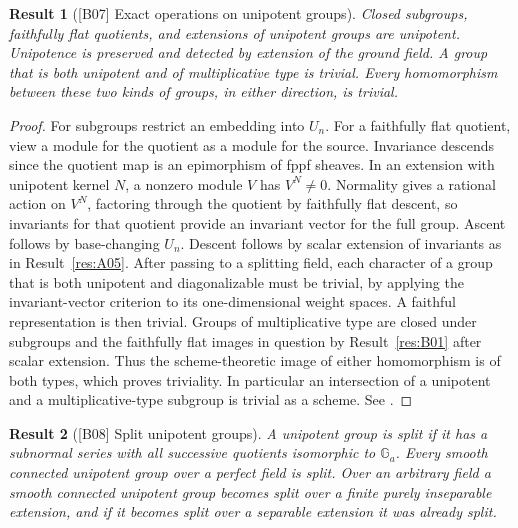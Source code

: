 \documentclass[11pt,a4paper,openany,oneside]{book}
\theoremstyle{resultstyle}
\newtheorem{statement}{Result}[chapter]
\newenvironment{result}[2]{\clubpenalty=10000\begin{statement}[\textnormal{[#1]} #2]\leavevmode\label{res:#1}\ignorespaces}{\end{statement}}
\theoremstyle{definition}
\numberwithin{equation}{chapter}
\begin{document}
\begin{result}{B07}{Exact operations on unipotent groups}
Closed subgroups, faithfully flat quotients, and extensions of
unipotent groups are unipotent. Unipotence is preserved and detected
by extension of the ground field. A group that is both unipotent
and of multiplicative type is trivial. Every homomorphism between
these two kinds of groups, in either direction, is trivial.
\end{result}

\begin{proof}
For subgroups restrict an embedding into \(U_n\).
For a faithfully flat quotient, view a module for the quotient as
a module for the source. Invariance descends since the quotient
map is an epimorphism of fppf sheaves. In an extension with
unipotent kernel \(N\), a nonzero module \(V\) has \(V^N\ne0\).
Normality gives a rational action on \(V^N\), factoring through the
quotient by faithfully flat descent, so invariants for that quotient
provide an invariant vector for the full group. Ascent follows by
base-changing \(U_n\). Descent follows by scalar extension of
invariants as in Result~\ref{res:A05}. After passing to a splitting
field, each character of a group that is both unipotent and
diagonalizable must be trivial, by applying the invariant-vector
criterion to its one-dimensional weight spaces. A faithful
representation is then trivial. Groups of multiplicative type are
closed under subgroups and the faithfully flat images in question
by Result~\ref{res:B01} after scalar extension. Thus the
scheme-theoretic image of either homomorphism is of both types,
which proves triviality. In particular an intersection of a
unipotent and a multiplicative-type subgroup is trivial as a
scheme. See \cite[Corollaries 14.7, 14.9--14.10 and
Proposition 14.16, Corollaries 14.17--14.18]{milne}.
\end{proof}

\begin{result}{B08}{Split unipotent groups}
A unipotent group is split if it has a subnormal series with all
successive quotients isomorphic to \(\mathbb G_a\).
Every smooth connected unipotent group over a perfect field is split.
Over an arbitrary field a smooth connected unipotent group becomes
split over a finite purely inseparable extension, and if it becomes
split over a separable extension it was already split.
\end{result}
\end{document}
